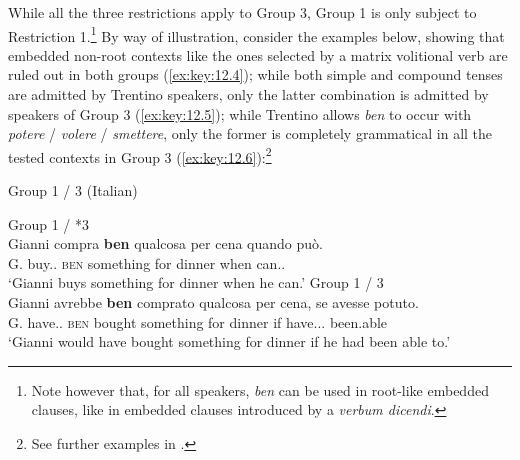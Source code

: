 \documentclass[output=paper]{langsci/langscibook}
\begin{document}
While all the three restrictions apply to Group 3, Group 1 is only subject to
Restriction 1.\footnote{Note however that, for all speakers, \emph{ben} can be
used in root-like embedded clauses, like in embedded clauses introduced by a
\emph{verbum dicendi}.}  By way of illustration, consider the examples below,
showing that embedded non-root contexts like the ones selected by a matrix
volitional verb are ruled out in both groups (\ref{ex:key:12.4}); while both simple and
compound tenses are admitted by Trentino speakers, only the latter combination
is admitted by speakers of Group 3 (\ref{ex:key:12.5}); while Trentino allows \emph{ben} to
occur with \emph{potere} / \emph{volere} / \emph{smettere}, only the former is
completely grammatical in all the tested contexts in Group 3 (\ref{ex:key:12.6}):\footnote{See
further examples in \textcite{CognSchi2018b,CognSchi2018}.}\largerpage[2]

\ea\label{ex:key:12.4} Group 1 / 3 (Italian)\\
	\label{ex:key:12.4a}
	\label{ex:key:12.4b}
	\z
\z

\ea\label{ex:key:12.5} 
	\ea\label{ex:key:12.5a} Group 1 / *3\\
        \sn
		\gll    Gianni compra \textbf{ben} qualcosa per cena quando può.\\
			    G. buy.\Prs.\Tsg{} \textsc{ben} something for dinner when can.\Prs.\Tsg{}\\
		\glt    \enquote*{Gianni buys something for dinner when he
        can.}\newpage
	\ex\label{ex:key:12.5b} Group 1 / 3\\
        \sn
		\gll    Gianni avrebbe \textbf{ben} comprato qualcosa per cena, se
        avesse potuto.\\
			    G. have.\Cond{}.\Tsg{} \textsc{ben} bought something for dinner if have.\Sbjv.\Ipfv.\Tsg{} been.able\\
		\glt    \enquote*{Gianni would have bought something for dinner if he had been able to.}
	\z
\z
\end{document}
